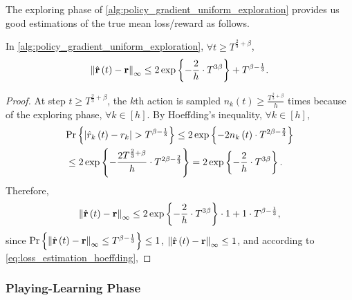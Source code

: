 The exploring phase of \cref{alg:policy_gradient_uniform_exploration} provides us good estimations of the true mean loss/reward as follows.
\begin{thm}
\label{thm:reward_estimation_hoeffding}
    In \cref{alg:policy_gradient_uniform_exploration}, $\forall t \ge T^{\frac{2}{3} + \beta}$,
\begin{equation*}
    \left\| \hat{{\mathbf{r}}}\left(t\right) - {\mathbf{r}} \right\|_\infty \le 2 \exp\left\{ - \frac{2}{h} \cdot  T^{3\beta} \right\} + T^{\beta - \frac{1}{3}}.
\end{equation*}
\end{thm}
\begin{proof}
    At step $t \ge T^{\frac{2}{3} + \beta}$, the $k$th action is sampled $n_{k}\left(t\right) \ge \frac{T^{\frac{2}{3} + \beta} }{h}$ times because of the exploring phase, $\forall k \in [h]$. By Hoeffding's inequality, $\forall k \in [h]$,
\begin{equation}
\label{eq:loss_estimation_hoeffding}
\begin{split}
    &{\text{Pr}}\left\{ \left| \hat{r}_{ k}\left(t\right) - r_{k} \right| > T^{\beta - \frac{1}{3}} \right\} \le 2 \exp\left\{ - 2 n_{ k}\left(t\right) \cdot T^{2\beta - \frac{2}{3}} \right\} \\
    &\le 2 \exp\left\{ -  \frac{2 T^{\frac{2}{3} + \beta}}{h} \cdot T^{2\beta - \frac{2}{3}} \right\} = 2 \exp\left\{ - \frac{2}{h} \cdot  T^{3\beta} \right\}.
\end{split}
\end{equation}
Therefore,
\begin{equation*}
\begin{split}
    \left\| \hat{{\mathbf{r}}}\left(t\right) - {\mathbf{r}} \right\|_\infty \le 2 \exp\left\{ - \frac{2}{h} \cdot  T^{3\beta} \right\} \cdot 1 + 1 \cdot T^{\beta - \frac{1}{3}},
\end{split}
\end{equation*}
since ${\text{Pr}}\left\{ \left\| \hat{{\mathbf{r}}}\left(t\right) - {\mathbf{r}} \right\|_\infty \le T^{\beta - \frac{1}{3}} \right\} \le 1$, $\left\| \hat{{\mathbf{r}}}\left(t\right) - {\mathbf{r}} \right\|_\infty \le 1$, and according to \cref{eq:loss_estimation_hoeffding}, 
\end{proof}

\subsubsection{Playing-Learning Phase}
\label{subsubsec:playing_learning_phase}

